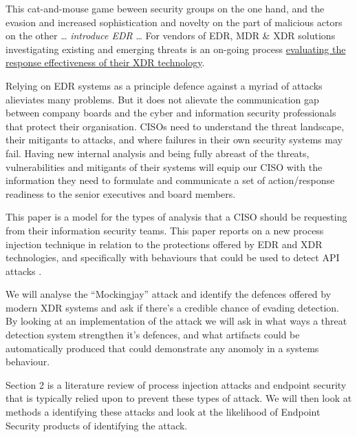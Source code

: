 
This cat-and-mouse game beween security groups on the one hand, and the evasion and increased sophistication and novelty on the part of malicious actors on the other \ldots
\textit{introduce EDR} \ldots
For vendors of EDR, MDR \& XDR solutions investigating existing and emerging threats is an on-going process \href{https://research.tue.nl/files/305661196/Olteanu_I.C..pdf}{evaluating the response effectiveness of their XDR technology}.


Relying on EDR systems as a principle defence against a myriad of attacks alieviates many problems.  But it does not alievate the communication gap between company boards
and the cyber and information security professionals that protect their organisation.  CISOs need to understand the threat landscape, their mitigants to attacks, and
where failures in their own security systems may fail.  Having new internal analysis and being fully abreast of the threats, vulnerabilities and mitigants of their
systems will equip our CISO with the information they need to formulate and communicate a set of action/response readiness to the senior executives and board members. 


This paper is a model for the types of analysis that a CISO should be requesting from their information security teams.  This paper reports on a new process injection technique \autocite{Peixoto:2023} in relation to the protections offered by EDR and XDR technologies, and specifically with behaviours that could be used to detect API attacks \autocite{Wang:2022}.

We will analyse the ``Mockingjay'' attack and identify the defences offered by modern XDR systems and ask if there's a credible chance of evading detection.  By looking at an implementation of the attack we will ask in what ways a threat detection system strengthen it's defences, and what artifacts could be automatically produced that could demonstrate any anomoly in a systems behaviour. 

Section 2 is a literature review of process injection attacks and endpoint security that is typically relied upon to prevent these types of attack.  We will then look at methods a identifying these attacks and look at the likelihood of Endpoint Security products of identifying the attack.

